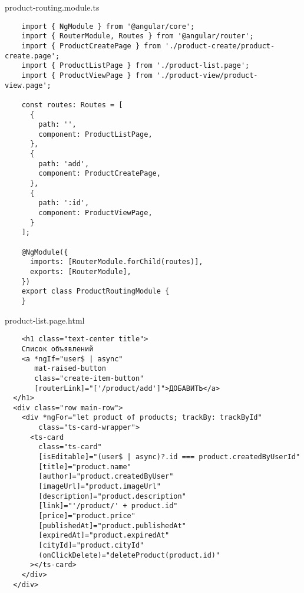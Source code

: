 product-routing.module.ts
\lstset{style=ts}
\begin{lstlisting}
    import { NgModule } from '@angular/core';
    import { RouterModule, Routes } from '@angular/router';
    import { ProductCreatePage } from './product-create/product-create.page';
    import { ProductListPage } from './product-list.page';
    import { ProductViewPage } from './product-view/product-view.page';
    
    const routes: Routes = [
      {
        path: '',
        component: ProductListPage,
      },
      {
        path: 'add',
        component: ProductCreatePage,
      },
      {
        path: ':id',
        component: ProductViewPage,
      }
    ];
    
    @NgModule({
      imports: [RouterModule.forChild(routes)],
      exports: [RouterModule],
    })
    export class ProductRoutingModule {
    }    
\end{lstlisting}

product-list.page.html
\begin{lstlisting}
    <h1 class="text-center title">
    Список объявлений
    <a *ngIf="user$ | async"
       mat-raised-button
       class="create-item-button"
       [routerLink]="['/product/add']">ДОБАВИТЬ</a>
  </h1>
  <div class="row main-row">
    <div *ngFor="let product of products; trackBy: trackById"
        class="ts-card-wrapper">
      <ts-card
        class="ts-card"
        [isEditable]="(user$ | async)?.id === product.createdByUserId"
        [title]="product.name"
        [author]="product.createdByUser"
        [imageUrl]="product.imageUrl"
        [description]="product.description"
        [link]="'/product/' + product.id"
        [price]="product.price"
        [publishedAt]="product.publishedAt"
        [expiredAt]="product.expiredAt"
        [cityId]="product.cityId"
        (onClickDelete)="deleteProduct(product.id)"
      ></ts-card>
    </div>
  </div>
\end{lstlisting}


